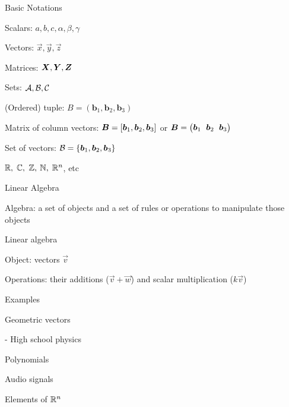 \documentclass[handout,fleqn,aspectratio=169]{beamer}
\begin{document}
\begin{frame}{Basic Notations}

\plitemsep 0.1in

\bci 
\item Scalars: $a,b,c,\alpha,\beta,\gamma$

\item Vectors: $\vec{x},\vec{y},\vec{z}$

\item Matrices: $\bm{X},\bm{Y},\bm{Z}$

\item Sets: $\mathcal A, \mathcal B, \mathcal C$

\item (Ordered) tuple: $B=(\bm{b}_1, \bm{b}_2, \bm{b}_3)$

\item Matrix of column vectors: $\bm{B} = [\bm{b}_1, \bm{b}_2, \bm{b}_3]$ or 
$\mB = \rowvec{\vb_1 & \vb_2 & \vb_3}$

\item Set of vectors:  $\mathcal B = \{\bm{b}_1, \bm{b}_2, \bm{b}_3 \}$

\item ${\mathbb R},$ ${\mathbb C},$ ${\mathbb Z},$ ${\mathbb N},$ ${\mathbb R}^n$, etc
\eci
\end{frame}

\begin{frame}{Linear Algebra}

\plitemsep 0.1in

\bci 
\item Algebra: a set of objects and a set of rules or operations to manipulate those objects

\item Linear algebra
\plitemsep 0.05in
\bci
\item Object: vectors $\vec{v}$
\item Operations: their additions ($\vec{v} + \vec{w}$) and scalar multiplication ($k\vec{v}$)
\eci

\item Examples

{
\bci
\item Geometric vectors

- High school physics
\item Polynomials
\item Audio signals
\item Elements of ${\mathbb R}^n$
\eci
}
{
\centering
{}
}

\eci
\end{frame}
\end{document}
